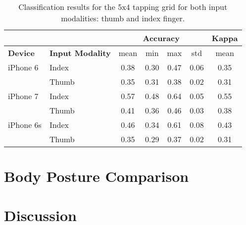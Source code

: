 \begin{table}[h!]
  \centering
\begin{tabular}{|l|l|c|c|c|c|c|}
  \cline{3-7}
  \multicolumn{2}{c}{} & \multicolumn{4}{|c|}{\textbf{Accuracy}} & \textbf{Kappa} \\
  \hline
  \textbf{Device} & \textbf{Input Modality} & mean &   min &   max  & std &  mean \\
  \hline
  iPhone 6 & Index &      0.38 &     0.30 &     0.47 &     0.06 &        0.35 \\
  & Thumb &      0.35 &     0.31 &     0.38 &     0.02 &        0.31 \\
  \hline
iPhone 7 & Index &      0.57 &     0.48 &     0.64 &     0.05 &        0.55 \\
  & Thumb &      0.41 &     0.36 &     0.46 &     0.03 &        0.38 \\
  \hline
iPhone 6s & Index &      0.46 &     0.34 &     0.61 &     0.08 &        0.43 \\
  & Thumb &      0.35 &     0.29 &     0.37 &     0.02 &        0.31 \\
  \hline
\end{tabular}
  \caption{Classification results for the 5x4 tapping grid for both input modalities: thumb and index finger.}
\end{table}

\section{Body Posture Comparison}



\section{Discussion}
